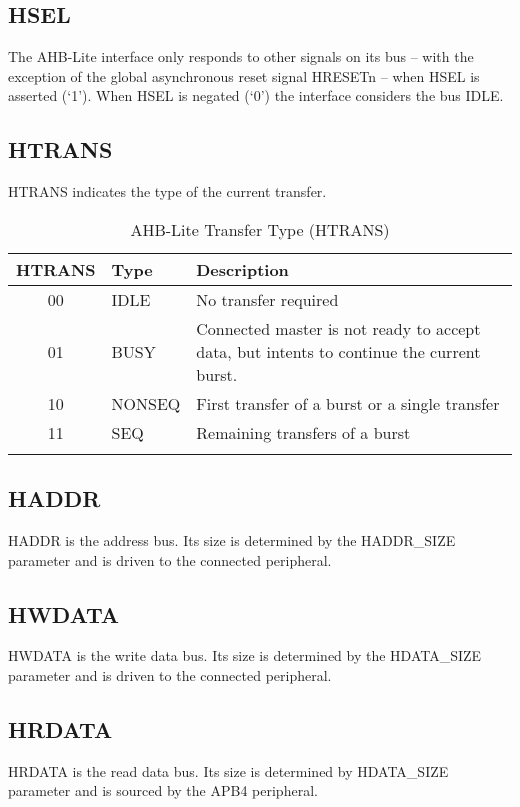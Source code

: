 \subsection{HSEL}\label{hsel}

The AHB-Lite interface only responds to other signals on its bus -- with
the exception of the global asynchronous reset signal HRESETn -- when
HSEL is asserted (`1'). When HSEL is negated (`0') the interface
considers the bus IDLE.

\subsection{HTRANS}\label{htrans}

HTRANS indicates the type of the current transfer.

\begin{longtable}[]{@{}clp{10cm}@{}}
\toprule
HTRANS & Type & Description\tabularnewline
\midrule
\endhead
00 & IDLE & No transfer required\tabularnewline
01 & BUSY & Connected master is not ready to accept data, but intents to
continue the current burst.\tabularnewline
10 & NONSEQ & First transfer of a burst or a single
transfer\tabularnewline
11 & SEQ & Remaining transfers of a burst\tabularnewline
\bottomrule
\caption{AHB-Lite Transfer Type (HTRANS)}
\end{longtable}

\subsection{HADDR}\label{haddr}

HADDR is the address bus. Its size is determined by the HADDR\_SIZE
parameter and is driven to the connected peripheral.

\subsection{HWDATA}\label{hwdata}

HWDATA is the write data bus. Its size is determined by the HDATA\_SIZE
parameter and is driven to the connected peripheral.

\subsection{HRDATA}\label{hrdata}

HRDATA is the read data bus. Its size is determined by HDATA\_SIZE
parameter and is sourced by the APB4 peripheral.

